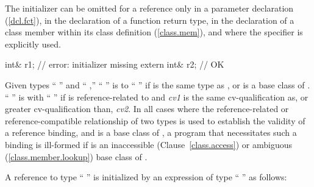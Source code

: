 \pnum
The initializer can be omitted for a reference only in a parameter declaration
(\ref{dcl.fct}), in the declaration of a function return type, in the declaration of
a class member within its class definition (\ref{class.mem}), and where the
specifier is explicitly used.
%
\enterexample

\begin{codeblock}
int& r1;                        // error: initializer missing
extern int& r2;                 // OK
\end{codeblock}
\exitexample

\pnum
Given types `` '' and `` ,''
`` '' is  to
%
`` '' if
is the same type as
,
or
is a base class of
.
`` '' is 
%
with `` '' if
is reference-related to
and
\textit{cv1}
is the same cv-qualification as, or greater cv-qualification than,
\textit{cv2}.
In all cases where the reference-related or reference-compatible relationship
of two types is used to establish the validity of a reference binding, and
is a base class of
,
a program that necessitates such a binding is ill-formed if
is an inaccessible (Clause~\ref{class.access}) or ambiguous (\ref{class.member.lookup})
base class of
.

\pnum
A reference to type `` '' is initialized by
an expression of type `` '' as follows:%

